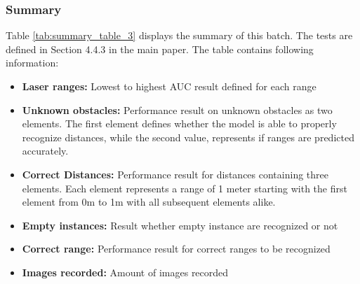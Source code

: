 \subsubsection{Summary\label{summary_batch_3} }
Table \ref{tab:summary_table_3} displays the summary of this batch. The tests are defined in Section 4.4.3 in the main paper. The table contains following information:
\begin{itemize}
\item  \textbf{Laser ranges: }Lowest to highest AUC result defined for each range
\item  \textbf{Unknown obstacles: }Performance result on unknown obstacles as two elements. The first element defines whether the model is able to properly recognize distances, while the second value, represents if ranges are predicted accurately.
\item  \textbf{Correct Distances: }Performance result for distances containing three elements. Each element represents a range of 1 meter starting with the first element from 0m to 1m with all subsequent elements alike.
\item  \textbf{Empty instances: }Result whether empty instance are recognized or not
\item  \textbf{Correct range: }Performance result for correct ranges to be recognized
\item  \textbf{Images recorded: }Amount of images recorded
\end{itemize}



